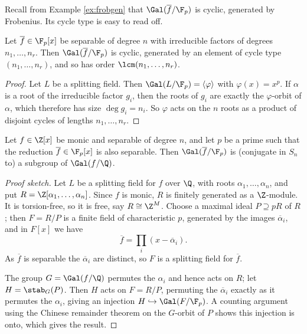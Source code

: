 Recall from Example \ref{ex:frobgen} that $\Gal(\overline f/\F_p)$ is cyclic, generated by Frobenius. Its cycle type is easy to read off.

\begin{proposition}\label{prop:fpcycle}
	Let $\overline f \in \F_p[x]$ be separable of degree $n$ with irreducible factors of degrees $n_1, \dots, n_r$. Then $\Gal(\overline f/\F_p)$ is cyclic, generated by an element of cycle type $(n_1,\dots,n_r)$, and so has order $\lcm(n_1,\dots,n_r)$.
\end{proposition}

\begin{proof}
	Let $L$ be a splitting field. Then $\Gal(L/\F_p) = \langle\varphi\rangle$ with $\varphi(x) = x^p$. If $\alpha$ is a root of the irreducible factor $g_i$, then the roots of $g_i$ are exactly the $\varphi$-orbit of $\alpha$, which therefore has size $\deg g_i = n_i$. So $\varphi$ acts on the $n$ roots as a product of disjoint cycles of lengths $n_1,\dots,n_r$.
\end{proof}

\begin{theorem}[Dedekind]\label{thm:dedekind}
	Let $f \in \Z[x]$ be monic and separable of degree $n$, and let $p$ be a prime such that the reduction $\overline f \in \F_p[x]$ is also separable. Then $\Gal(\overline f/\F_p)$ is (conjugate in $S_n$ to) a subgroup of $\Gal(f/\Q)$.
\end{theorem}

\begin{proof}[Proof sketch]
	Let $L$ be a splitting field for $f$ over $\Q$, with roots $\alpha_1,\dots,\alpha_n$, and put $R = \Z[\alpha_1,\dots,\alpha_n]$. Since $f$ is monic, $R$ is finitely generated as a $\Z$-module. It is torsion-free, so it is free, say $R \cong \Z^M$. Choose a maximal ideal $P \supseteq pR$ of $R$; then $F = R/P$ is a finite field of characteristic $p$, generated by the images $\overline\alpha_i$, and in $F[x]$ we have
	$$\overline f = \prod_i (x - \overline\alpha_i).$$ As $\overline f$ is separable the $\overline\alpha_i$ are distinct, so $F$ is a splitting field for $\overline f$.

	The group $G = \Gal(f/\Q)$ permutes the $\alpha_i$ and hence acts on $R$; let $H = \stab_G(P)$. Then $H$ acts on $F = R/P$, permuting the $\overline\alpha_i$ exactly as it permutes the $\alpha_i$, giving an injection $H \hookrightarrow \Gal(F/\F_p)$. A counting argument using the Chinese remainder theorem on the $G$-orbit of $P$ shows this injection is onto, which gives the result.
\end{proof}

